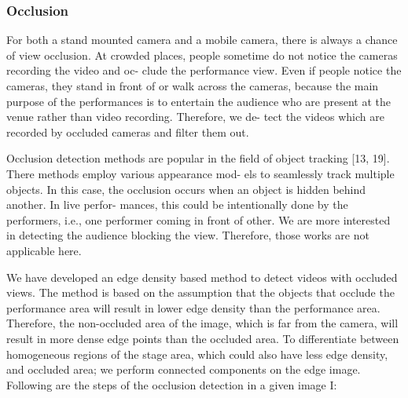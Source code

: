 \documentclass{sig-alternate}
\begin{document}
\subsubsection{Occlusion}
For both a stand mounted camera and a mobile camera, there
is always a chance of view occlusion. At crowded places, people
sometime do not notice the cameras recording the video and oc-
clude the performance view. Even if people notice the cameras,
they stand in front of or walk across the cameras, because the main
purpose of the performances is to entertain the audience who are
present at the venue rather than video recording. Therefore, we de-
tect the videos which are recorded by occluded cameras and filter
them out.

Occlusion detection methods are popular in the field of object
tracking [13, 19]. There methods employ various appearance mod-
els to seamlessly track multiple objects. In this case, the occlusion
occurs when an object is hidden behind another. In live perfor-
mances, this could be intentionally done by the performers, i.e.,
one performer coming in front of other. We are more interested in
detecting the audience blocking the view. Therefore, those works
are not applicable here. 

We have developed an edge density based method to detect videos
with occluded views. The method is based on the assumption that
the objects that occlude the performance area will result in lower
edge density than the performance area. Therefore, the non-occluded
area of the image, which is far from the camera, will result in more
dense edge points than the occluded area. To differentiate between
homogeneous regions of the stage area, which could also have less
edge density, and occluded area; we perform connected components on the edge image. Following are the steps of the occlusion detection in a given image I:
\end{document}
